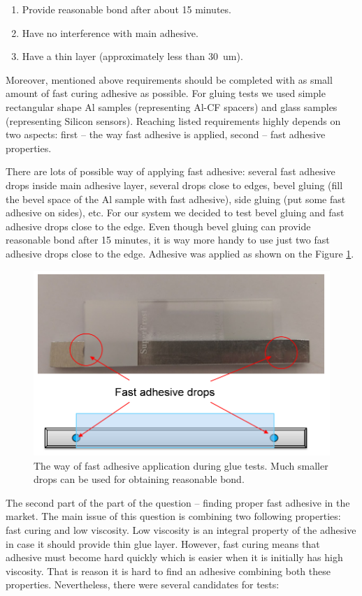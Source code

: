 \begin{enumerate}
\setlength\itemsep{-0.5em}
\item Provide reasonable bond after about 15 minutes.
\item Have no interference with main adhesive.
\item Have a thin layer (approximately less than 30~um).
\end{enumerate}

Moreover, mentioned above requirements should be completed with as small amount of fast curing adhesive as possible. For gluing tests we used simple rectangular shape Al samples (representing Al-CF spacers) and glass samples (representing Silicon sensors). Reaching listed requirements highly depends on two aspects: first -- the way fast adhesive is applied, second -- fast adhesive properties.

There are lots of possible way of applying fast adhesive: several fast adhesive drops inside main adhesive layer, several drops close to edges, bevel gluing (fill the bevel space of the Al sample with fast adhesive), side gluing (put some fast adhesive on sides), etc. For our system we decided to test bevel gluing and fast adhesive drops close to the edge. Even though bevel gluing can provide reasonable bond after 15 minutes, it is way more handy to use just two fast adhesive drops close to the edge. Adhesive was applied as shown on the Figure \ref{fig:glue_application}. 

\begin{figure}[ht]\centering
\includegraphics[width=0.7\linewidth]{Data/Module_assembly/Fast_glue_application.png}
\caption{The way of fast adhesive application during glue tests. Much smaller drops can be used for obtaining reasonable bond.}
\label{fig:glue_application}
\end{figure}

The second part of the part of the question -- finding proper fast adhesive in the market. The main issue of this question is combining two following properties: fast curing and low viscosity. Low viscosity is an integral property of the adhesive in case it should provide thin glue layer. However, fast curing means that adhesive must become hard quickly which is easier when it is initially has high viscosity. That is reason it is hard to find an adhesive combining both these properties. Nevertheless, there were several candidates for tests:

